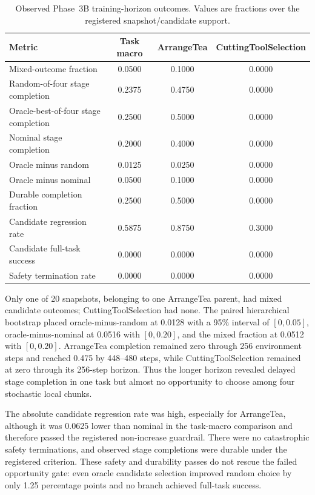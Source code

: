 \begin{table}[H]
\centering
\caption{Observed Phase~3B training-horizon outcomes. Values are fractions over the registered snapshot/candidate support.}
\label{tab:phase3b-observed}
\small
\begin{tabularx}{\textwidth}{Y c c c}
\toprule
Metric & Task macro & ArrangeTea & CuttingToolSelection \\
\midrule
Mixed-outcome fraction & 0.0500 & 0.1000 & 0.0000 \\
Random-of-four stage completion & 0.2375 & 0.4750 & 0.0000 \\
Oracle-best-of-four stage completion & 0.2500 & 0.5000 & 0.0000 \\
Nominal stage completion & 0.2000 & 0.4000 & 0.0000 \\
Oracle minus random & 0.0125 & 0.0250 & 0.0000 \\
Oracle minus nominal & 0.0500 & 0.1000 & 0.0000 \\
Durable completion fraction & 0.2500 & 0.5000 & 0.0000 \\
Candidate regression rate & 0.5875 & 0.8750 & 0.3000 \\
Candidate full-task success & 0.0000 & 0.0000 & 0.0000 \\
Safety termination rate & 0.0000 & 0.0000 & 0.0000 \\
\bottomrule
\end{tabularx}
\end{table}

Only one of 20 snapshots, belonging to one ArrangeTea parent, had mixed candidate outcomes; CuttingToolSelection had none. The paired hierarchical bootstrap placed oracle-minus-random at 0.0128 with a 95\% interval of $[0,0.05]$, oracle-minus-nominal at 0.0516 with $[0,0.20]$, and the mixed fraction at 0.0512 with $[0,0.20]$. ArrangeTea completion remained zero through 256 environment steps and reached 0.475 by 448--480 steps, while CuttingToolSelection remained at zero through its 256-step horizon. Thus the longer horizon revealed delayed stage completion in one task but almost no opportunity to choose among four stochastic local chunks.

The absolute candidate regression rate was high, especially for ArrangeTea, although it was 0.0625 lower than nominal in the task-macro comparison and therefore passed the registered non-increase guardrail. There were no catastrophic safety terminations, and observed stage completions were durable under the registered criterion. These safety and durability passes do not rescue the failed opportunity gate: even oracle candidate selection improved random choice by only 1.25 percentage points and no branch achieved full-task success.

